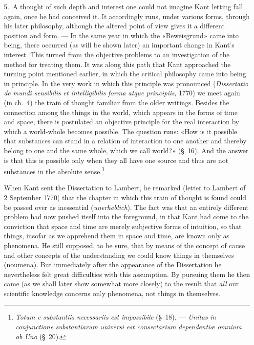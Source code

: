 \documentclass[12pt,a4paper]{article}
\newcommand{\opage}[1]{\marginnote{\footnotesize\textit{[#1]}}}
\begin{document}
5.\ A thought of such depth and interest one could not imagine Kant
\opage{14}letting fall again, once he had conceived it. It accordingly runs, under
various forms, through his later philosophy, although the altered point of
view gives it a different position and form. --- In the same year in which
the «Beweisgrund» came into being, there occurred (as will be shown later)
an important change in Kant's interest. This turned from the objective
problems to an investigation of the method for treating them. It was along
this path that Kant approached the turning point mentioned earlier, in
which the critical philosophy came into being in principle. In the very
work in which this principle was pronounced (\textit{Dissertatio de mundi
sensibilis et intelligibilis forma atque principiis,} 1770) we meet again
(in ch.\ 4) the train of thought familiar from the older writings. Besides
the connection among the things in the world, which appears in the forms
of time and space, there is postulated an objective principle for the real
interaction by which a world-whole becomes possible. The question runs:
«How is it possible that substances can stand in a relation of interaction
to one another and thereby belong to one and the same whole, which we call
world?» (§\ 16). And the answer is that this is possible only when they
all have one source and thus are not substances in the absolute
sense.\footnote{\textit{Totum e substantiis necessariis est impossibile}
(§\ 18). --- \textit{Unitas in conjunctione substantiarum universi est
consectarium dependentiæ omnium ab Uno} (§\ 20).}

When Kant sent the Dissertation to Lambert, he remarked (letter to Lambert
of 2 September 1770) that the chapter in which this train of thought is
found could be passed over as inessential (\textit{unerheblich}). The fact
was that an entirely different problem had now pushed itself into the
foreground, in that Kant had come to the conviction that space and time
are merely subjective forms of intuition, so that things, insofar as we
apprehend them in space and time, are known only as phenomena. He still
supposed, to be sure, that by means of the concept of cause and other
concepts of the understanding we could know things in themselves
(noumena). But immediately after the appearance of the Dissertation he
nevertheless felt great difficulties with this assumption. By pursuing
them he then came (as we shall later show somewhat more closely) to the
result that \emph{all} our scientific knowledge concerns only phenomena, not
things in themselves.
\end{document}
